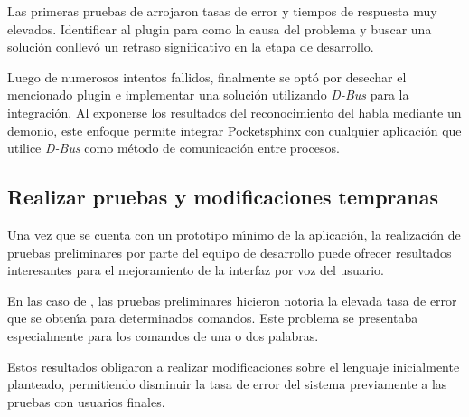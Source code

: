 Las primeras pruebas de  arrojaron tasas de error y tiempos de
respuesta muy elevados. Identificar al plugin para  como la causa del problema
y buscar una soluci\'on conllev\'o un retraso significativo en la etapa de desarrollo.

Luego de numerosos intentos fallidos, finalmente se opt\'o por desechar el mencionado plugin
e implementar una soluci\'on utilizando \emph{D-Bus} para la integraci\'on. Al exponerse los
resultados del reconocimiento del habla mediante un demonio, este enfoque permite integrar
Pocketsphinx con cualquier aplicaci\'on que utilice \emph{D-Bus} como m\'etodo de comunicaci\'on
entre procesos.

\subsection{Realizar pruebas y modificaciones tempranas}
Una vez que se cuenta con un prototipo m{\'\i}nimo de la aplicaci\'on, la realizaci\'on de pruebas preliminares
por parte del equipo de desarrollo puede ofrecer resultados interesantes para el mejoramiento de la 
interfaz por voz del usuario.

En las caso de , las pruebas preliminares hicieron notoria la elevada tasa
de error que se obten{\'\i}a para determinados comandos. Este problema se presentaba especialmente para
los comandos de una o dos palabras.

Estos resultados obligaron a realizar modificaciones sobre el lenguaje inicialmente planteado,
permitiendo disminuir la tasa de error del sistema previamente a las pruebas con usuarios
finales.
